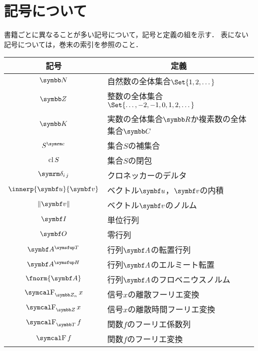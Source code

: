 \documentclass[../../main]{subfiles}
\begin{document}
\chapter{記号について}
\thispagestyle{empty}
書籍ごとに異なることが多い記号について，記号と定義の組を示す．
表にない記号については，巻末の索引を参照のこと．

\vspace*{\fill}
\begin{table*}
  \centering
  \begin{tabular}{c|l} \hline
    記号 & \multicolumn{1}{c}{定義} \\ \hline
    \(\numset{N}\) & 自然数の全体集合\(\Set{1,2,\dotsc}\) \\
    \(\numset{Z}\) & 整数の全体集合\(\Set{\dotsc,-2,-1,0,1,2,\dotsc}\) \\
    \(\numset{K}\) & 実数の全体集合\(\numset{R}\)か複素数の全体集合\(\numset{C}\) \\
    \(\scomp{S}\) & 集合\(S\)の補集合 \\
    \(\operatorname{cl} S\) & 集合\(S\)の閉包 \\
    \(\kdelta{i}{j}\) & クロネッカーのデルタ \\
    \(\innerp{\vect{u}}{\vect{v}}\) & ベクトル\(\vect{u}\)，\(\vect{v}\)の内積 \\
    \(\vnorm{\vect{v}}\) & ベクトル\(\vect{v}\)のノルム \\
    \(\imat\) & 単位行列 \\
    \(\zmat\) & 零行列 \\
    \(\trps{\mat{A}}\) & 行列\(\mat{A}\)の転置行列 \\
    \(\htrps{\mat{A}}\) & 行列\(\mat{A}\)のエルミート転置 \\
    \(\fnorm{\mat{A}}\) & 行列\(\mat{A}\)のフロベニウスノルム \\
    \(\dft{n}x\) & 信号\(x\)の離散フーリエ変換 \\
    \(\dtft x\) & 信号\(x\)の離散時間フーリエ変換 \\
    \(\fseries f\) & 関数\(f\)のフーリエ係数列 \\
    \(\ftrans f\) & 関数\(f\)のフーリエ変換 \\ \hline
  \end{tabular}
\end{table*}
\vspace*{\fill}
\end{document}

